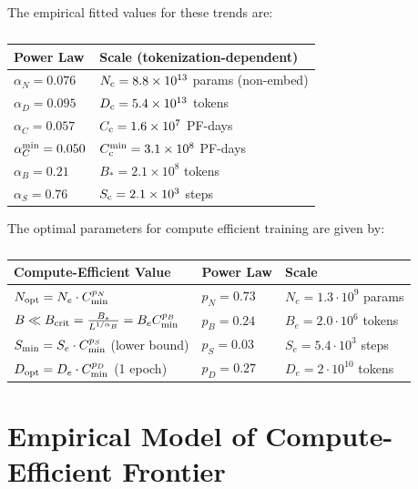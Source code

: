 \documentclass[english]{article}
\begin{document}
The empirical fitted values for these trends are:


\begin{table}[h!]
\centering
\vspace{-0.5em}
\begin{tabular}{|l|l|}
\hline 
\textbf{Power Law}  & \textbf{Scale (tokenization-dependent)}\tabularnewline
\hline 
\hline 
$\alpha_{N}=0.076$  & $N_{{\rm c}}=8.8\times10^{13}$ params (non-embed)\tabularnewline
\hline 
$\alpha_{D}=0.095$  & $D_{{\rm c}}=5.4\times10^{13}$ tokens\tabularnewline
\hline 
$\alpha_{C}=0.057$  & $C_{{\rm c}}=1.6\times10^{7}$ PF-days\tabularnewline
\hline 
$\alpha_{C}^{{\rm min}}=0.050$  & $C_{{\rm c}}^{{\rm min}}=3.1\times10^{8}$ PF-days\tabularnewline
\hline 
$\alpha_{B}=0.21$  & $B_{\ast}=2.1\times10^{8}$ tokens\tabularnewline
\hline 
$\alpha_{S}=0.76$  & $S_{{\rm c}}=2.1\times10^{3}$ steps\tabularnewline
\hline 
\end{tabular}
\vspace{0.5em}
\caption[Key parameters to trend fits]{}
\vspace{-1em}
\end{table}

The optimal parameters for compute efficient training are given by:

\begin{table}[h!]
\centering
\vspace{-0.5em}
\begin{tabular}{|l|l|l|}
\hline 
\textbf{Compute-Efficient Value} & \textbf{Power Law} & \textbf{Scale}\tabularnewline
\hline 
\hline 
$N_{{\rm opt}}=N_{e}\cdot C_{{\rm min}}^{p_{N}}$ & $p_{N}=0.73$ & $N_{e}=1.3\cdot10^{9}$ params\tabularnewline
\hline 
$B \ll B_{{\rm crit}}=\frac{B_{\ast}}{L^{1/\alpha_{B}}}=B_{e}C_{{\rm min}}^{p_{B}}$ & $p_{B}=0.24$ & $B_{e}=2.0\cdot10^{6}$ tokens\tabularnewline
\hline 
$S_{{\rm min}}=S_{e}\cdot C_{{\rm min}}^{p_{S}}$ (lower bound) & $p_{S}=0.03$ & $S_{e}=5.4\cdot10^{3}$ steps\tabularnewline
\hline 
$D_{{\rm opt}}=D_{e}\cdot C_{{\rm min}}^{p_{D}}$ (1 epoch) & $p_{D}=0.27$ & $D_{e}=2\cdot10^{10}$ tokens\tabularnewline
\hline 
\end{tabular}
\vspace{0.5em}
\caption[Trends for compute-efficient training]{}
\vspace{-1em}
\end{table}





\section{Empirical Model of Compute-Efficient Frontier}
\label{app:ComputeEfficientTraining}
\end{document}
